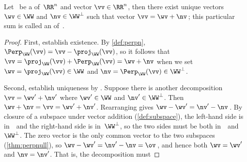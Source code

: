 \begin{theorem} \label{thm:odt}
Let \WW\ be a  of~\(\RR^n\) and vector \(\vv\in\RR^n\), then there exist unique vectors \(\wv\in\WW\) and \(\nv\in\WW^\perp\) such that vector \(\vv=\wv+\nv\)\,; this particular sum is called an  of~\vv.
\end{theorem}

\begin{proof} 
First, establish existence.  
By \cref{def:perpn}, \(\Perp_\WW(\vv)=\vv-\proj_\WW(\vv)\), so it follows that \(\vv=\proj_\WW(\vv)+\Perp_\WW(\vv)=\wv+\nv\) when we set \(\wv=\proj_\WW(\vv)\in\WW\) and \(\nv=\Perp_\WW(\vv)\in\WW^\perp\).

Second, establish uniqueness by .
Suppose there is another decomposition \(\vv=\wv'+\nv'\) where \(\wv'\in\WW\) and \(\nv'\in\WW^\perp\).
Then \(\wv+\nv=\vv=\wv'+\nv'\).
Rearranging gives \(\wv-\wv'=\nv'-\nv\)\,.
By closure of a subspace under vector addition (\cref{def:subspace}), the left-hand side is in~\WW\ and the right-hand side is in~\(\WW^\perp\), so the two sides must be both in~\WW\ and~\(\WW^\perp\).
The zero vector is the only common vector to the two subspaces (\cref{thm:perpnull}), so \(\wv-\wv'=\nv'-\nv=\ov\)\,, and hence both \(\wv=\wv'\) and \(\nv=\nv'\).
That is, the decomposition must 
\end{proof}


\newcommand{\projxv}[9]{\begin{tikzpicture}
  \begin{axis}[footnotesize
  ,axis equal ,axis x line=none , axis y line=none
  ,samples=2, enlarge x limits={value=0.15,auto} ]
  \addplot[black,mark=*]coordinates {(0,0)};
  \addplot[red,quiver={u=#1,v=#2},-stealth]coordinates {(0,0)};
  \node[right] at (axis cs:#1,#2) {$\vec #9$};
  \addplot[blue,quiver={u=#3,v=#4},-stealth]coordinates {(0,0)};
  \node[right] at (axis cs:#3,#4) {$\vec #8$};
  \ifnum#7>0
  \addplot[black] coordinates {(#5/2,#6/2)} node {proj};
  \addplot[brown,thick,quiver={u=#5,v=#6},-stealth]coordinates {(0,0)};
  \addplot[black] coordinates {(#1/2+#5/2,#2/2+#6/2)} node {perp};
  \addplot[brown,thick,quiver={u=#1-#5,v=#2-#6},-stealth]coordinates {(#5,#6)};
  \fi
  \end{axis}
\end{tikzpicture}}

